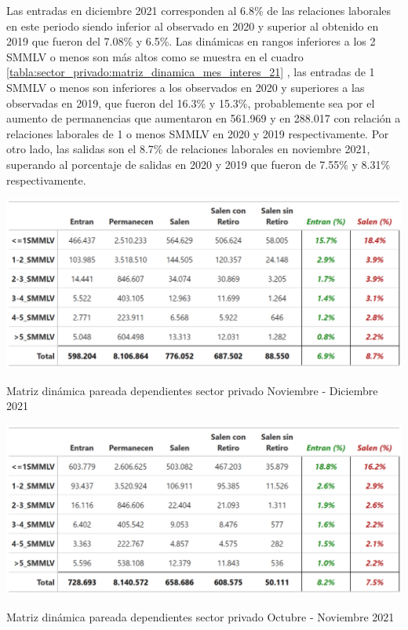 Las entradas en diciembre 2021 corresponden al 6.8\% de las relaciones laborales en este periodo siendo inferior al observado en 2020 y superior al obtenido en 2019 que fueron del 7.08\% y 6.5\%. Las dinámicas en rangos inferiores a los 2 SMMLV o menos son más altos como se muestra en el cuadro \ref{tabla:sector_privado:matriz_dinamica_mes_interes_21} , las entradas de 1 SMMLV o menos son inferiores a los observados en 2020 y superiores a las observadas en 2019, que fueron del 16.3\% y 15.3\%, probablemente sea por el aumento de permanencias que aumentaron en 561.969 y en 288.017 con relación a relaciones laborales de 1 o menos SMMLV en 2020 y 2019 respectivamente. Por otro lado, las salidas son el 8.7\% de relaciones laborales en noviembre 2021, superando al porcentaje de salidas en 2020 y 2019 que fueron de 7.55\% y 8.31\% respectivamente. 

\begin{table}[!htbp]
\centering
\includegraphics[width = 15cm]{results/02_longitudinal/salida_resumen_dependientes_interes_21.png}
\caption{Matriz dinámica pareada dependientes sector privado Noviembre - Diciembre 2021}%
\label{tabla:sector_privado:matriz_dinamica_mes_interes_21}
\end{table}

\begin{table}[!htbp]
\centering
\includegraphics[width = 15cm]{results/02_longitudinal/salida_resumen_dependientes_referencia_21.png}
\caption{Matriz dinámica pareada dependientes sector privado Octubre - Noviembre 2021}%
\label{tabla:sector_privado:matriz_dinamica_mes_referencia_21}
\end{table}

